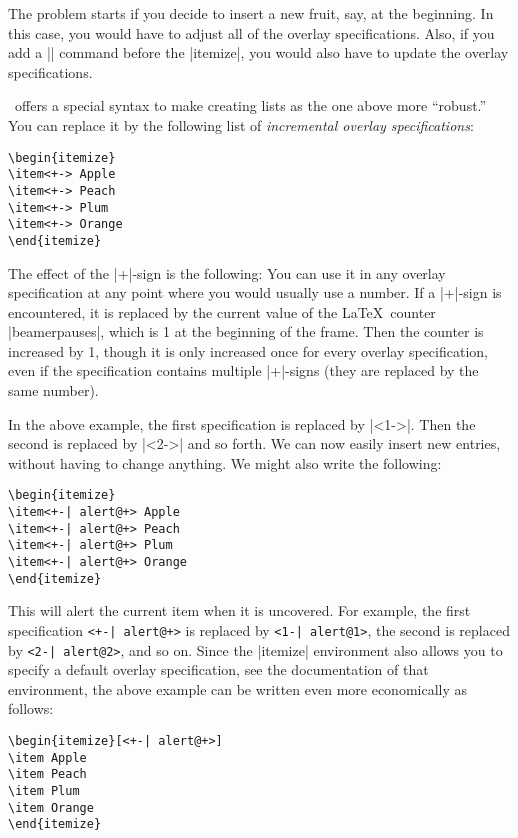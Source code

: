 The problem starts if you decide to insert a new fruit, say, at the beginning. In this case, you would have to adjust all of the overlay specifications. Also, if you add a |\pause| command before the |itemize|, you would also have to update the overlay specifications.

\beamer\ offers a special syntax to make creating lists as the one above more ``robust.'' You can replace it by the following list of \emph{incremental overlay specifications}:
\begin{verbatim}
\begin{itemize}
\item<+-> Apple
\item<+-> Peach
\item<+-> Plum
\item<+-> Orange
\end{itemize}
\end{verbatim}

The effect of the |+|-sign is the following: You can use it in any overlay specification at any point where you would usually use a number. If a |+|-sign is encountered, it is replaced by the current value of the \LaTeX\ counter |beamerpauses|, which is 1 at the beginning of the frame. Then the counter is increased by 1, though it is only increased once for every overlay specification, even if the specification contains multiple |+|-signs (they are replaced by the same number).

In the above example, the first specification is replaced by |<1->|. Then the second is replaced by |<2->| and so forth. We can now easily insert new entries, without having to change anything. We might also write the following:
\begin{verbatim}
\begin{itemize}
\item<+-| alert@+> Apple
\item<+-| alert@+> Peach
\item<+-| alert@+> Plum
\item<+-| alert@+> Orange
\end{itemize}
\end{verbatim}

This will alert the current item when it is uncovered. For example, the first specification \verb/<+-| alert@+>/ is replaced by \verb/<1-| alert@1>/, the second is replaced by \verb/<2-| alert@2>/, and so on. Since the |itemize| environment also allows you to specify a default overlay specification, see the documentation of that environment, the above example can be written even more economically as follows:
\begin{verbatim}
\begin{itemize}[<+-| alert@+>]
\item Apple
\item Peach
\item Plum
\item Orange
\end{itemize}
\end{verbatim}


